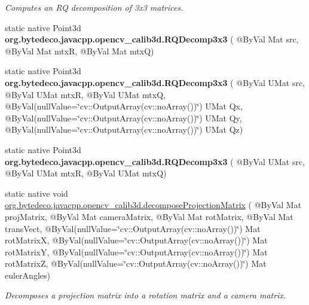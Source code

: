 \begin{DoxyCompactItemize}
\begin{DoxyCompactList}\small\item\em Computes an RQ decomposition of 3x3 matrices. \end{DoxyCompactList}\item 
\mbox{\label{group__calib3d_ga10bd113db30f3e06287793c1755d1384}} 
static native Point3d {\bfseries org.\+bytedeco.\+javacpp.\+opencv\+\_\+calib3d.\+R\+Q\+Decomp3x3} ( @By\+Val Mat src, @By\+Val Mat mtxR, @By\+Val Mat mtxQ)
\item 
\mbox{\label{group__calib3d_ga568c5cec5f4745f770b81ad3d2499df0}} 
static native Point3d {\bfseries org.\+bytedeco.\+javacpp.\+opencv\+\_\+calib3d.\+R\+Q\+Decomp3x3} ( @By\+Val U\+Mat src, @By\+Val U\+Mat mtxR, @By\+Val U\+Mat mtxQ, @By\+Val(null\+Value=\char`\"{}cv\+::\+Output\+Array(cv\+::no\+Array())\char`\"{}) U\+Mat Qx, @By\+Val(null\+Value=\char`\"{}cv\+::\+Output\+Array(cv\+::no\+Array())\char`\"{}) U\+Mat Qy, @By\+Val(null\+Value=\char`\"{}cv\+::\+Output\+Array(cv\+::no\+Array())\char`\"{}) U\+Mat Qz)
\item 
\mbox{\label{group__calib3d_ga5322c68273d292a5f0875f3aef267bd2}} 
static native Point3d {\bfseries org.\+bytedeco.\+javacpp.\+opencv\+\_\+calib3d.\+R\+Q\+Decomp3x3} ( @By\+Val U\+Mat src, @By\+Val U\+Mat mtxR, @By\+Val U\+Mat mtxQ)
\item 
static native void \hyperlink{group__calib3d_gadf0e43ed7b680f17d039735e4a9f64c5}{org.\+bytedeco.\+javacpp.\+opencv\+\_\+calib3d.\+decompose\+Projection\+Matrix} ( @By\+Val Mat proj\+Matrix, @By\+Val Mat camera\+Matrix, @By\+Val Mat rot\+Matrix, @By\+Val Mat trans\+Vect, @By\+Val(null\+Value=\char`\"{}cv\+::\+Output\+Array(cv\+::no\+Array())\char`\"{}) Mat rot\+MatrixX, @By\+Val(null\+Value=\char`\"{}cv\+::\+Output\+Array(cv\+::no\+Array())\char`\"{}) Mat rot\+MatrixY, @By\+Val(null\+Value=\char`\"{}cv\+::\+Output\+Array(cv\+::no\+Array())\char`\"{}) Mat rot\+MatrixZ, @By\+Val(null\+Value=\char`\"{}cv\+::\+Output\+Array(cv\+::no\+Array())\char`\"{}) Mat euler\+Angles)
\begin{DoxyCompactList}\small\item\em Decomposes a projection matrix into a rotation matrix and a camera matrix. \end{DoxyCompactList}\item 
\mbox{\label{group__calib3d_ga97d8d4858f2df0719fa85beff68783e9}} 

\end{DoxyCompactItemize}
